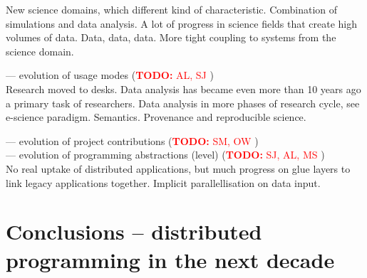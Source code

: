 \documentclass{article}
\newcommand{\B}[1]{\textbf{#1}}
\newcommand{\todo}[1]{{\textcolor{red}{\B{TODO:} #1 }}}
\begin{document}
 New science domains, which different kind of characteristic.
 Combination of simulations and data analysis. A lot of progress in science fields that create high volumes of data.
Data, data, data.
More tight coupling to systems from the science domain.
 
 --- evolution of usage modes (\todo{AL, SJ})\\
 
 Research moved to desks. Data analysis has became even more than 10 years ago a primary task of researchers.
 Data analysis in more phases of research cycle, see e-science paradigm.
Semantics.
Provenance and reproducible science.
  
 --- evolution of project contributions (\todo{SM, OW})\\
 
 --- evolution of programming abstractions (level) (\todo{SJ, AL, MS})\\
 
No real uptake of distributed applications, but much progress on glue layers to link legacy applications together.
Implicit parallellisation on data input.


\section{Conclusions -- distributed programming in the next decade}







\footnotesize


\end{document}
